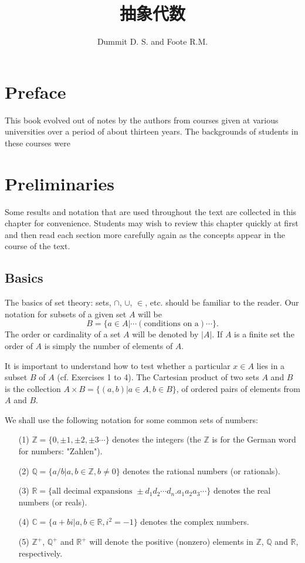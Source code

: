 \documentclass[cn,11pt,chinese]{elegantbook}
\title{抽象代数}
\author{Dummit D. S. and Foote R.M.}
\def\real{\mathbb{R}}
\numberwithin{equation}{section}
\begin{document}
\maketitle

\tableofcontents
\mainmatter
\hypersetup{pageanchor=true}

\chapter*{Preface}
This book evolved out of notes by the authors from courses given at various universities over a period of about thirteen years. The backgrounds of students in these courses were 


\chapter*{Preliminaries}\label{chapter000}
Some results and notation that are used throughout the text are collected in this chapter for convenience. Students may wish to review this chapter quickly at first and then read each section more carefully again as the concepts appear in the course of the text.

\section{Basics}\label{section00001}
The basics of set theory: sets, $\cap$, $\cup$, $\in$, etc. should be familiar to the reader. Our notation for subsets of a given set $A$ will be
\[
B = \{a \in A | \cdots (\text{conditions on a}) \cdots\}.
\]
The order or cardinality of a set $A$ will be denoted by $|A|$. If $A$ is a finite set the order of $A$ is simply the number of elements of $A$.

It is important to understand how to test whether a particular $x \in A$ lies in a subset $B$ of $A$ (cf. Exercises 1 to 4). The Cartesian product of two sets $A$ and $B$ is the collection $A \times B = \{(a, b)| a \in A, b \in B\}$, of ordered pairs of elements from $A$ and $B$.

We shall use the following notation for some common sets of numbers:
\begin{enumerate}
\item[(1)] $\mathbb{Z}= \{0, \pm{1}, \pm{2}, \pm{3}\cdots\}$ denotes the integers (the $\mathbb{Z}$ is for the German word for numbers: "Zahlen").
\item[(2)] $\mathbb{Q} = \{a/b|a, b \in \mathbb{Z}, b \neq 0\}$ denotes the rational numbers (or rationals).
\item[(3)] $\real = \{\text{all decimal expansions }\pm{d_1d_2\cdots d_n.a_1a_2a_3\cdots}\}$ denotes the real numbers (or reals).
\item[(4)] $\mathbb{C} = \{a + bi|a, b \in \real, i^2 = -1\}$ denotes the complex numbers.
\item[(5)] $\mathbb{Z}^+$, $\mathbb{Q}^+$ and $\real^+$ will denote the positive (nonzero) elements in $\mathbb{Z}$, $\mathbb{Q}$ and $\real$, respectively.
\end{enumerate}
\end{document}
